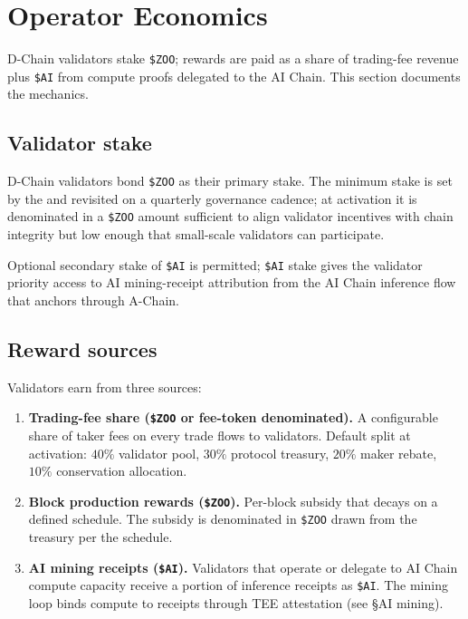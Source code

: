 \section{Operator Economics}
\label{sec:operator-economics}

\Zoo{} D-Chain validators stake \texttt{\$ZOO}; rewards are paid as
a share of trading-fee revenue plus \texttt{\$AI} from compute proofs
delegated to the \Hanzo{} AI Chain. This section documents the
mechanics.

\subsection{Validator stake}

\Zoo{} D-Chain validators bond \texttt{\$ZOO} as their primary
stake. The minimum stake is set by the \Zoo{} \DAO{} and revisited
on a quarterly governance cadence; at activation it is denominated
in a \texttt{\$ZOO} amount sufficient to align validator incentives
with chain integrity but low enough that small-scale validators can
participate.

Optional secondary stake of \texttt{\$AI} is permitted; \texttt{\$AI}
stake gives the validator priority access to AI mining-receipt
attribution from the \Hanzo{} AI Chain inference flow that anchors
through A-Chain.

\subsection{Reward sources}

Validators earn from three sources:

\begin{enumerate}[leftmargin=1.4em]
  \item \textbf{Trading-fee share (\texttt{\$ZOO} or fee-token
        denominated).} A configurable share of taker fees on every
        trade flows to validators. Default split at activation:
        $40\%$ validator pool, $30\%$ protocol treasury, $20\%$ maker
        rebate, $10\%$ conservation allocation.
  \item \textbf{Block production rewards (\texttt{\$ZOO}).}
        Per-block subsidy that decays on a defined schedule. The
        subsidy is denominated in \texttt{\$ZOO} drawn from the
        treasury per the \Zoo{} \DAO{} schedule.
  \item \textbf{AI mining receipts (\texttt{\$AI}).}
        Validators that operate or delegate to \Hanzo{} AI Chain
        compute capacity receive a portion of inference receipts as
        \texttt{\$AI}. The mining loop binds compute to receipts
        through TEE attestation (see \cite{zoo-4-0} \S AI mining).
\end{enumerate}

